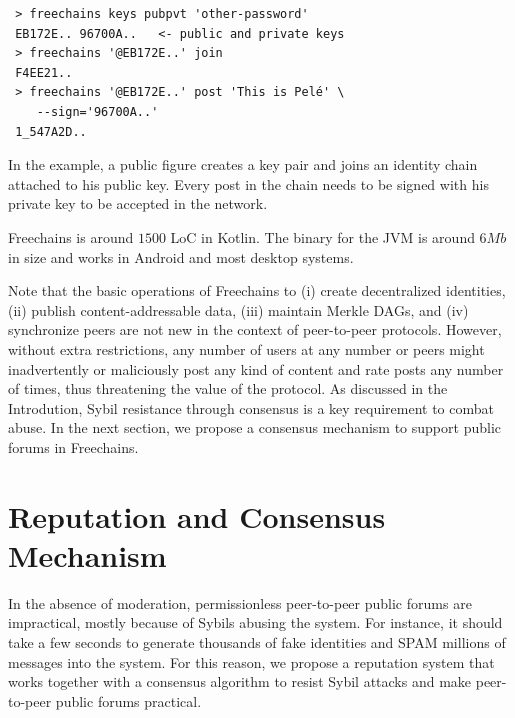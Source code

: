 \documentclass[10pt,journal,compsoc]{IEEEtran}
\newcommand{\FC}       {Freechains\xspace}
\begin{document}
{\footnotesize
\begin{verbatim}
 > freechains keys pubpvt 'other-password'
 EB172E.. 96700A..   <- public and private keys
 > freechains '@EB172E..' join
 F4EE21..
 > freechains '@EB172E..' post 'This is Pelé' \
    --sign='96700A..'
 1_547A2D..
\end{verbatim}
}

In the example, a public figure creates a key pair and joins an identity chain
attached to his public key.
Every post in the chain needs to be signed with his private key to be accepted
in the network.

\FC is around $1500$ LoC in Kotlin. %
The binary for the JVM is around $6Mb$ in size and works in Android and most
desktop systems.

Note that the basic operations of Freechains to (i) create decentralized
identities, (ii) publish content-addressable data, (iii) maintain Merkle DAGs,
and (iv) synchronize peers are not new in the context of peer-to-peer
protocols.
%
However, without extra restrictions, any number of users at any number or peers
might inadvertently or maliciously post any kind of content and rate posts any
number of times, thus threatening the value of the protocol.
%
As discussed in the Introdution, Sybil resistance through consensus is a key
requirement to combat abuse.
%
In the next section, we propose a consensus mechanism to support public forums
in \FC.

\section{Reputation and Consensus Mechanism}
\label{sec.consensus}

In the absence of moderation, permissionless peer-to-peer public forums are
impractical, mostly because of Sybils abusing the system.
For instance, it should take a few seconds to generate thousands of fake
identities and SPAM millions of messages into the system.
For this reason, we propose a reputation system that works together with a
consensus algorithm to resist Sybil attacks and make peer-to-peer public forums
practical.
\end{document}

